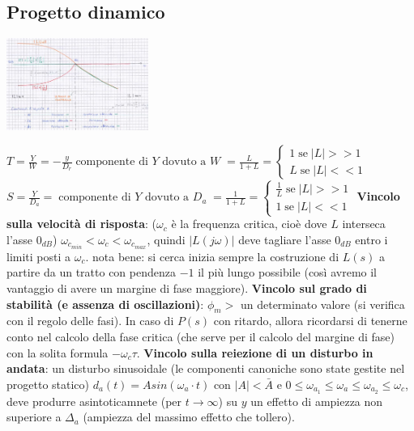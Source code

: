     \subsection{Progetto dinamico}
    \begin{center}
        \includegraphics[height=3cm]{../formulario/img3.JPG}
    \end{center}
    $T = \frac{Y}{W} = - \frac{y}{D_r}\; \text{componente di $Y$ dovuto a $W$}\; = \frac{L}{1+L} = \begin{cases}
        1 \; \text{se}\; |L| >> 1\\
        L \; \text{se}\; |L| << 1
    \end{cases}$\newline
    $S = \frac{Y}{D_a} =\; \text{componente di $Y$ dovuto a $D_a$}\; = \frac{1}{1+L} = \begin{cases}
        \frac{1}{L} \; \text{se}\; |L| >> 1\\
        1 \; \text{se}\; |L| << 1
    \end{cases}$\newline
    \newline
    \textbf{Vincolo sulla velocità di risposta}: ($\omega_c$ è la frequenza critica, cioè dove $L$ interseca l'asse $0_{dB}$) $\omega_{c_{min}} < \omega_c < \omega_{c_{max}}$, quindi $|L(j \omega)|$ deve tagliare l'asse $0_{dB}$ entro i limiti posti a $\omega_c$. \newline
    nota bene: si cerca inizia sempre la costruzione di $L(s)$ a partire da un tratto con pendenza $-1$ il più lungo possibile (così avremo il vantaggio di avere un margine di fase maggiore).\newline
    \textbf{Vincolo sul grado di stabilità (e assenza di oscillazioni)}: $\phi_m > $ un determinato valore (si verifica con il regolo delle fasi). In caso di $P(s)$ con ritardo, allora ricordarsi di tenerne conto nel calcolo della fase critica (che serve per il calcolo del margine di fase) con la solita formula $-\omega_c \tau$.\newline
    \textbf{Vincolo sulla reiezione di un disturbo in andata}: un disturbo sinusoidale (le componenti canoniche sono state gestite nel progetto statico) $d_a(t) = A sin (\omega_a \cdot  t)$ con $|A| < \bar{A}$ e $0 \leq \omega_{a_1} \leq \omega_a \leq \omega_{a_2} \leq \omega_c$, deve produrre asintoticamnete (per $t \rightarrow \infty$) su $y$ un effetto di ampiezza non superiore a $\Delta_a$ (ampiezza del massimo effetto che tollero).\newline
